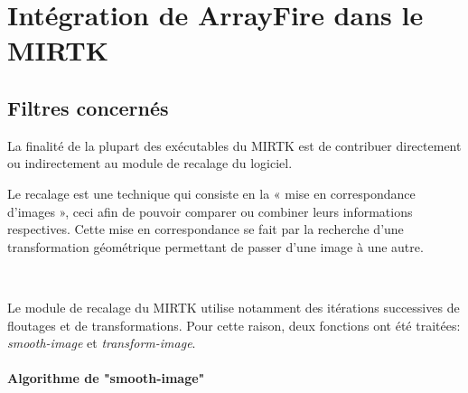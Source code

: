 \documentclass[10pt]{report}
\begin{document}
	
	
	
	\section{Intégration de ArrayFire dans le MIRTK}
	\subsection{Filtres concernés}
	La finalité de la plupart des exécutables du MIRTK est de contribuer directement ou indirectement au module de recalage du logiciel. 
	
	Le recalage est une technique qui consiste en la « mise en correspondance d'images », ceci afin de pouvoir comparer ou combiner leurs informations respectives. Cette mise en correspondance se fait par la recherche d'une transformation géométrique permettant de passer d'une image à une autre.
	
	~\par
	Le module de recalage du MIRTK utilise notamment des itérations successives de floutages et de transformations. Pour cette raison, deux fonctions ont été traitées: \textit{smooth-image} et \textit{transform-image}.
	\paragraph{Algorithme de "smooth-image"}
~\par
\end{document}
